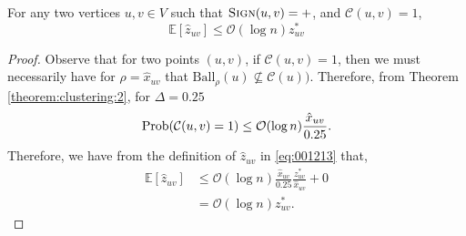 \begin{claim} \label{claim:000}
For any two vertices $u,v \in V$ such that $\textsc{Sign} (u,v) = +$, and $\mathcal{C} (u,v) = 1$,
\begin{equation*}
    \mathbb{E} [\hat{z}_{uv}] \le \mathcal{O} (\log n) z_{uv}^*
\end{equation*}
\end{claim}
\begin{proof}
Observe that for two points $(u,v)$, if $\mathcal{C} (u,v) = 1$, then we must necessarily have for $\rho = \hat{x}_{uv}$ that $\mathrm{Ball}_\rho(u) \nsubseteq \mathcal{C}(u))$. Therefore, from Theorem \ref{theorem:clustering:2}, for $\Delta = 0.25$
\begin{equation*}
    {\rm Prob} (\mathcal{C} (u,v) = 1) \le \mathcal{O} (\log n) \frac{\hat{x}_{uv}}{0.25}.
\end{equation*}
Therefore, we have from the definition of $\hat{z}_{uv}$ in \eqref{eq:001213} that,
    \begin{align*}
        \mathbb{E} [\hat{z}_{uv}] &\le \mathcal{O} (\log n) \frac{\hat{x}_{uv}}{0.25} \frac{z^*_{uv}}{\hat{x}_{uv}} + 0\\
        &= \mathcal{O} (\log n ) z^*_{uv}.
    \end{align*}
\end{proof}

